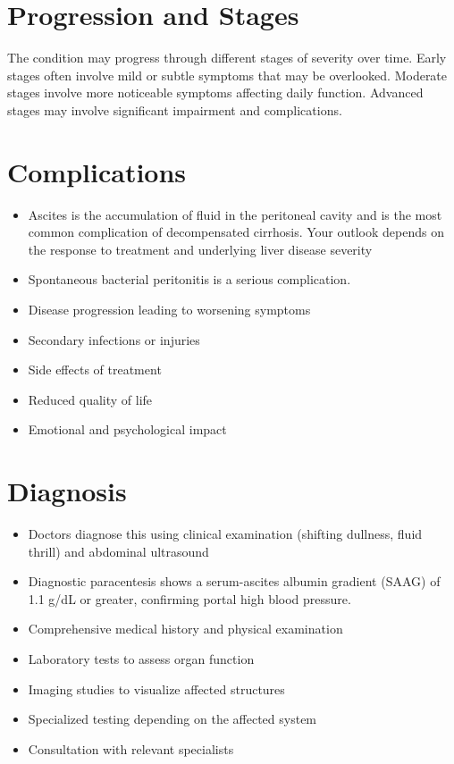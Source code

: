 \section{Progression and Stages}
The condition may progress through different stages of severity over time. Early stages often involve mild or subtle symptoms that may be overlooked. Moderate stages involve more noticeable symptoms affecting daily function. Advanced stages may involve significant impairment and complications.
\section{Complications}
\begin{itemize}[noitemsep]
  \item Ascites is the accumulation of fluid in the peritoneal cavity and is the most common complication of decompensated cirrhosis. Your outlook depends on the response to treatment and underlying liver disease severity
  \item Spontaneous bacterial peritonitis is a serious complication.
  \item Disease progression leading to worsening symptoms
  \item Secondary infections or injuries
  \item Side effects of treatment
  \item Reduced quality of life
  \item Emotional and psychological impact
\end{itemize}
\section{Diagnosis}
\begin{itemize}[noitemsep]
  \item Doctors diagnose this using clinical examination (shifting dullness, fluid thrill) and abdominal ultrasound
  \item Diagnostic paracentesis shows a serum-ascites albumin gradient (SAAG) of 1.1 g/dL or greater, confirming portal high blood pressure.
  \item Comprehensive medical history and physical examination
  \item Laboratory tests to assess organ function
  \item Imaging studies to visualize affected structures
  \item Specialized testing depending on the affected system
  \item Consultation with relevant specialists
\end{itemize}
